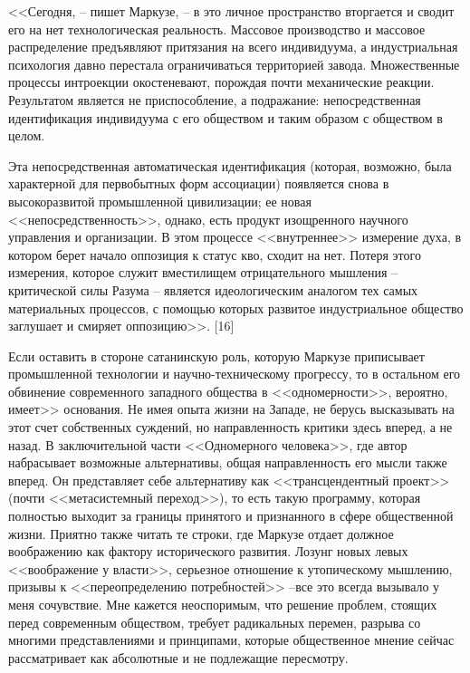 \documentclass{book}
\begin{document}
<<Сегодня, -- пишет Маркузе, -- в это личное пространство вторгается и сводит его на нет технологическая реальность. Массовое производство и массовое распределение предъявля­ют притязания на всего  индивидуума, а индустриальная психо­логия давно перестала ограничиваться территорией завода. Множественные процессы интроекции окостеневают, порож­дая почти механические реакции. Результатом является не при­способление, а подражание:  непосредственная идентификация индивидуума с его  обществом и таким образом с обществом в целом.

Эта непосредственная автоматическая идентификация (ко­торая, возможно, была характерной для первобытных форм ассоциации) появляется снова в высокоразвитой промышлен­ной цивилизации; ее новая <<непосредственность>>, однако, есть продукт изощренного научного управления и организа­ции. В этом процессе <<внутреннее>> измерение духа, в котором берет начало оппозиция к статус кво, сходит на нет. Потеря этого измерения, которое служит вместилищем отрицатель­ного мышления -- критической силы Разума -- является иде­ологическим аналогом тех самых материальных процессов, с помощью которых развитое индустриальное общество заглу­шает и смиряет оппозицию>>. [16]

Если оставить в стороне сатанинскую роль, которую Маркузе приписывает промышленной технологии и научно-техниче­скому прогрессу, то в остальном его обвинение современного западного общества в <<одномерности>>, вероятно, имеет>> осно­вания. Не имея опыта жизни на Западе, не берусь высказывать на этот счет собственных суждений, но направленность критики здесь вперед, а не назад. В заключительной части <<Одномерно­го человека>>, где автор набрасывает возможные альтернативы, общая направленность его мысли также вперед. Он представ­ляет себе альтернативу как <<трансцендентный проект>> (почти <<метасистемный переход>>), то есть такую программу, кото­рая полностью выходит за границы принятого и признанного в сфере общественной жизни. Приятно также читать те строки, где Маркузе отдает должное воображению как фактору исто­рического развития. Лозунг новых левых <<воображение у власти>>, серьезное отношение к утопическому мышлению, призывы к <<переопределению потребностей>> --все это всегда вызывало у меня сочувствие. 
Мне кажется 
неоспоримым, что решение проблем, стоящих перед современным обществом, требует радикальных перемен, разрыва со многими представ­лениями и принципами, которые общественное мнение сейчас рассматривает как абсолютные и не подлежащие пересмотру.
\end{document}
